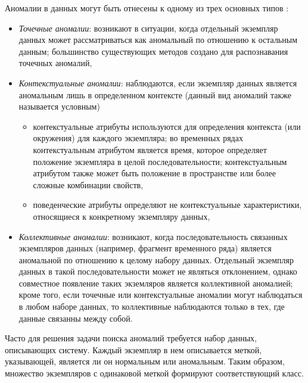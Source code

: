 \documentclass[%
	11pt,
	a4paper,
	utf8,
		]{article}
\begin{document}
Аномалии в данных могут быть отнесены к одному из трех основных типов \cite{chandola:2009}:
\begin{itemize}
	\item \emph{Точечные аномалии}: возникают в ситуации, когда отдельный экземпляр данных может рассматриваться как аномальный по отношению к остальным данным; большинство существующих методов создано для распознавания точечных аномалий,
	
	\item \emph{Контекстуальные аномалии}: наблюдаются, если экземпляр данных является аномальным лишь в определенном контексте (данный вид аномалий также называется условным)
	
	\begin{itemize}
		\item контекстуальные атрибуты используются для определения контекста (или окружения) для каждого экземпляра; во временных рядах контекстуальным атрибутом является время, которое определяет положение экземпляра в целой последовательности; контекстуальным атрибутом также может быть положение в пространстве или более сложные комбинации свойств,
		
		\item поведенческие атрибуты определяют не контекстуальные характеристики, относящиеся к конкретному экземпляру данных,
	\end{itemize}
	
	\item \emph{Коллективные аномалии}: возникают, когда последовательность связанных экземпляров данных (например, фрагмент временного ряда) является аномальной по отношению к целому набору данных. Отдельный экземпляр данных в такой последовательности может не являться отклонением, однако совместное появление таких экземляров является коллективной аномалией; кроме того, если точечные или контекстуальные аномалии могут наблюдаться в любом наборе данных, то коллективные наблюдаются только в тех, где данные связанны между собой.
\end{itemize}

Часто для решения задачи поиска аномалий требуется набор данных, описывающих систему. Каждый экземпляр в нем описывается меткой, указывающей, является ли он нормальным или аномальным. Таким образом, множество экземпляров с одинаковой меткой формируют соответствующий класс. 
\end{document}
